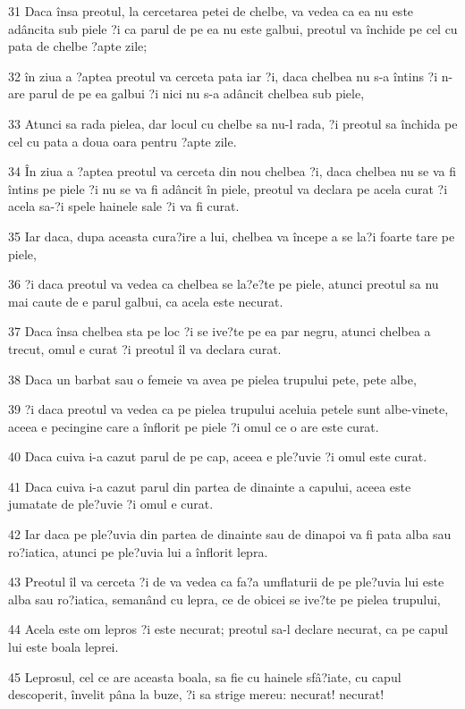 \par 31 Daca însa preotul, la cercetarea petei de chelbe, va vedea ca ea nu este adâncita sub piele ?i ca parul de pe ea nu este galbui, preotul va închide pe cel cu pata de chelbe ?apte zile;
\par 32 în ziua a ?aptea preotul va cerceta pata iar ?i, daca chelbea nu s-a întins ?i n-are parul de pe ea galbui ?i nici nu s-a adâncit chelbea sub piele,
\par 33 Atunci sa rada pielea, dar locul cu chelbe sa nu-l rada, ?i preotul sa închida pe cel cu pata a doua oara pentru ?apte zile.
\par 34 În ziua a ?aptea preotul va cerceta din nou chelbea ?i, daca chelbea nu se va fi întins pe piele ?i nu se va fi adâncit în piele, preotul va declara pe acela curat ?i acela sa-?i spele hainele sale ?i va fi curat.
\par 35 Iar daca, dupa aceasta cura?ire a lui, chelbea va începe a se la?i foarte tare pe piele,
\par 36 ?i daca preotul va vedea ca chelbea se la?e?te pe piele, atunci preotul sa nu mai caute de e parul galbui, ca acela este necurat.
\par 37 Daca însa chelbea sta pe loc ?i se ive?te pe ea par negru, atunci chelbea a trecut, omul e curat ?i preotul îl va declara curat.
\par 38 Daca un barbat sau o femeie va avea pe pielea trupului pete, pete albe,
\par 39 ?i daca preotul va vedea ca pe pielea trupului aceluia petele sunt albe-vinete, aceea e pecingine care a înflorit pe piele ?i omul ce o are este curat.
\par 40 Daca cuiva i-a cazut parul de pe cap, aceea e ple?uvie ?i omul este curat.
\par 41 Daca cuiva i-a cazut parul din partea de dinainte a capului, aceea este jumatate de ple?uvie ?i omul e curat.
\par 42 Iar daca pe ple?uvia din partea de dinainte sau de dinapoi va fi pata alba sau ro?iatica, atunci pe ple?uvia lui a înflorit lepra.
\par 43 Preotul îl va cerceta ?i de va vedea ca fa?a umflaturii de pe ple?uvia lui este alba sau ro?iatica, semanând cu lepra, ce de obicei se ive?te pe pielea trupului,
\par 44 Acela este om lepros ?i este necurat; preotul sa-l declare necurat, ca pe capul lui este boala leprei.
\par 45 Leprosul, cel ce are aceasta boala, sa fie cu hainele sfâ?iate, cu capul descoperit, învelit pâna la buze, ?i sa strige mereu: necurat! necurat!
